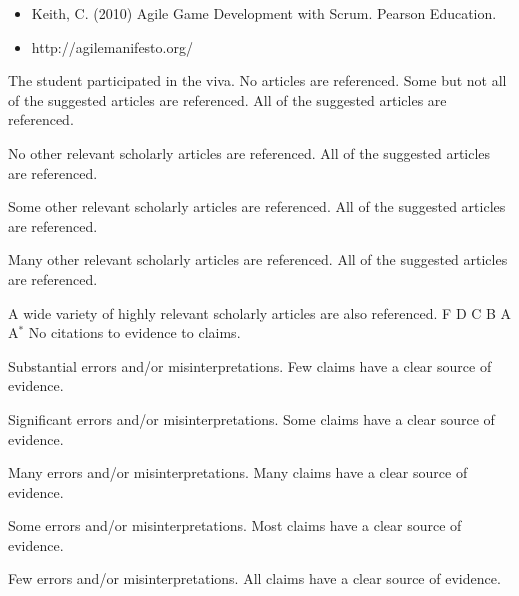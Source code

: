 \documentclass{../fal_assignment}
\begin{document}
\begin{itemize}
    \item Keith, C. (2010) Agile Game Development with Scrum. Pearson Education.
    \item http://agilemanifesto.org/
\end{itemize}

\begin{markingrubric}
%
        \grade 		The student participated in the viva.
%
        \grade\fail	No articles are referenced.
        \grade		Some but not all of the suggested articles are referenced.
        \grade		All of the suggested articles are referenced.
        \par		No other relevant scholarly articles are referenced.
        \grade		All of the suggested articles are referenced.
        \par		Some other relevant scholarly articles are referenced.
        \grade		All of the suggested articles are referenced.
        \par		Many other relevant scholarly articles are referenced.
        \grade		All of the suggested articles are referenced.
        \par		A wide variety of highly relevant scholarly articles are also referenced.
%
        \grade\fail F
        \grade		D
        \grade		C
        \grade		B
        \grade		A
        \grade		A$^*$
%
        \grade\fail 	No citations to evidence to claims.
        \par 		Substantial errors and/or misinterpretations.
        \grade 		Few claims have a clear source of evidence.
        \par 		Significant errors and/or misinterpretations.
        \grade 		Some claims have a clear source of evidence.
        \par 		Many errors and/or misinterpretations.
        \grade 		Many claims have a clear source of evidence.
        \par 		Some errors and/or misinterpretations.
        \grade 		Most claims have a clear source of evidence.
        \par 		Few errors and/or misinterpretations.
        \grade 		All claims have a clear source of evidence.

\end{markingrubric}
\end{document}
